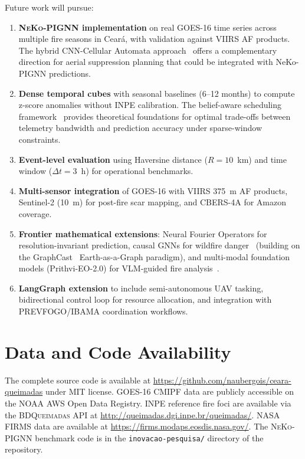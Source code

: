 \documentclass[5p,twocolumn]{elsarticle}
\newcommand{\abbrev}[1]{{\small\textsc{#1}}}
\begin{document}
Future work will pursue:
\begin{enumerate}
  \item \textbf{\abbrev{NeKo-PIGNN} implementation} on real \abbrev{GOES-16} time series across multiple fire seasons in Cear\'{a}, with validation against \abbrev{VIIRS} \abbrev{AF} products. The hybrid CNN-Cellular Automata approach~\cite{matei2026} offers a complementary direction for aerial suppression planning that could be integrated with NeKo-PIGNN predictions.
  \item \textbf{Dense temporal cubes} with seasonal baselines (6--12 months) to compute z-score anomalies without \abbrev{INPE} calibration. The belief-aware scheduling framework~\cite{shao2026} provides theoretical foundations for optimal trade-offs between telemetry bandwidth and prediction accuracy under sparse-window constraints.
  \item \textbf{Event-level evaluation} using Haversine distance ($R = 10$~km) and time window ($\Delta t = 3$~h) for operational benchmarks.
  \item \textbf{Multi-sensor integration} of \abbrev{GOES-16} with \abbrev{VIIRS} 375~m \abbrev{AF} products, Sentinel-2 (10~m) for post-fire scar mapping, and \abbrev{CBERS}-4A for Amazon coverage.
  \item \textbf{Frontier mathematical extensions}: Neural Fourier Operators for resolution-invariant prediction, causal \abbrev{GNN}s for wildfire danger~\cite{davalas2024} (building on the GraphCast~\cite{lam2023_graphcast} Earth-as-a-Graph paradigm), and multi-modal foundation models (Prithvi-EO-2.0) for \abbrev{VLM}-guided fire analysis~\cite{wildfirevlm2026}.
  \item \textbf{LangGraph extension} to include semi-autonomous UAV tasking, bidirectional control loop for resource allocation, and integration with \abbrev{PREVFOGO}/IBAMA coordination workflows.
\end{enumerate}

\section*{Data and Code Availability}

The complete source code is available at \url{https://github.com/naubergois/ceara-queimadas} under MIT license. \abbrev{GOES-16} \abbrev{CMIPF} data are publicly accessible on the \abbrev{NOAA} AWS Open Data Registry. \abbrev{INPE} reference fire foci are available via the \abbrev{BDQueimadas} \abbrev{API} at \url{http://queimadas.dgi.inpe.br/queimadas/}. \abbrev{NASA} \abbrev{FIRMS} data are available at \url{https://firms.modaps.eosdis.nasa.gov/}. The \abbrev{NeKo-PIGNN} benchmark code is in the \texttt{inovacao-pesquisa/} directory of the repository.
\end{document}
